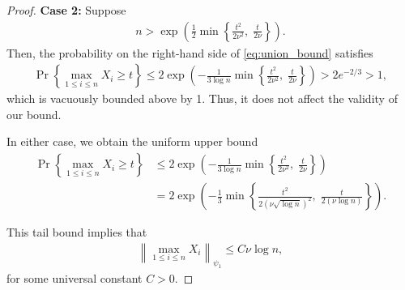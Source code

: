 \documentclass[10pt,a4paper]{amsart}
\begin{document}
\begin{proof}
\smallskip
\textbf{Case 2:} Suppose
\begin{align*}
    n > \exp\left(
        \frac{1}{2} \min\left\{
            \frac{t^2}{2\nu^{2}},\;
            \frac{t}{2\nu}
        \right\}
    \right).
\end{align*}
Then, the probability on the right-hand side of \cref{eq:union_bound} satisfies
\begin{align*}
    \Pr\left\{ \max_{1 \leq i \leq n} X_i \ge t \right\}
    \le
    2\exp\left(
        -\frac{1}{3\log n}
        \min\left\{
            \frac{t^2}{2\nu^2},\;
            \frac{t}{2\nu}
        \right\}
    \right)
    > 2e^{-2/3} > 1,
\end{align*}
which is vacuously bounded above by 1. Thus, it does not affect the validity of our bound.

In either case, we obtain the uniform upper bound
\begin{align*}
    \Pr\left\{ \max_{1 \leq i \leq n} X_i \ge t \right\}
    &\le
    2\exp\left(
        -\frac{1}{3\log n}
        \min\left\{
            \frac{t^2}{2\nu^2},\;
            \frac{t}{2\nu}
        \right\}
    \right) \\
    &=
    2\exp\left(
        -\frac{1}{3}
        \min\left\{
            \frac{t^2}{2(\nu\sqrt{\log n})^2},\;
            \frac{t}{2(\nu\log n)}
        \right\}
    \right).
\end{align*}

This tail bound implies that
\begin{align*}
    \left\| \max_{1 \leq i \leq n} X_i \right\|_{\psi_1} \leq C \nu \log n,
\end{align*}
for some universal constant \( C > 0 \).
\end{proof}
\end{document}
